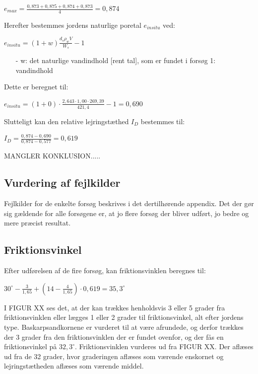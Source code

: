 \begin{center}
	$e_{max} = \frac{0,\!873 + 0,\!875 + 0,\!874 + 0,\!873}{4} = 0,\!874$
\end{center}

Herefter bestemmes jordens naturlige poretal $e_{in situ}$ ved:

\begin{center}
	$e_{in situ} = (1 + w) \frac{d_s  \rho_w  V}{W_s} - 1$
\end{center}

\begin{itemize}
	\item[-] w: det naturlige vandindhold [rent tal], som er fundet i forsøg 1: vandindhold 
\end{itemize}

Dette er beregnet til:

\begin{center}
	$e_{in situ} = (1+0) \cdot \frac{2,\!643 \cdot 1,\!00 \cdot 269,\!39}{421,\!4} - 1 = 0,\!690$
\end{center}

Slutteligt kan den relative lejringstæthed $I_D$ bestemmes til:

\begin{center}
	$I_D = \frac{0,\!874 - 0,\!690}{0,\!874 - 0,\!577} = 0,\!619$
\end{center}

MANGLER KONKLUSION.....

\subsection{Vurdering af fejlkilder}
Fejlkilder for de enkelte forsøg beskrives i det dertilhørende appendix. Det der gør sig gældende for alle forsøgene er, at jo flere forsøg der bliver udført, jo bedre og mere præcist resultat. 

\subsection{Friktionsvinkel}
Efter udførelsen af de fire forsøg, kan friktionsvinklen beregnes til:

\begin{center}
	$30^\circ - \frac{3}{1,\!65} + (14 - \frac{4}{1,\!65}) \cdot 0,\!619 = 35,\!3^\circ$
\end{center}

I FIGUR XX ses det, at der kan trækkes henholdsvis 3 eller 5 grader fra friktionsvinklen eller lægges 1 eller 2 grader til friktionsvinkel, alt efter jordens type. Baskarpsandkornene er vurderet til at være afrundede, og derfor trækkes der 3 grader fra den friktionsvinklen der er fundet ovenfor, og der fås en friktionsvinkel på $32,\!3^\circ$. 
\newline
\newline
Friktionsvinklen vurderes ud fra FIGUR XX. Der aflæses ud fra de 32 grader, hvor graderingen aflæses som værende enskornet og lejringstætheden aflæses som værende middel.